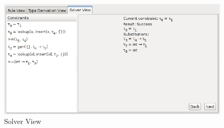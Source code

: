 \begin{figure}[t]
\begin{center}
\leavevmode
\includegraphics[width=\textwidth]{Figures/solverview.png}
\end{center}
\caption{Solver View}
\label{fig:solverview}
\end{figure}